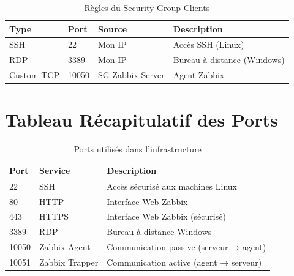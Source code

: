 \begin{table}[H]
\centering
\caption{Règles du Security Group Clients}
\label{tab:sg-clients}
\begin{tabular}{|l|l|l|l|}
\hline
\textbf{Type} & \textbf{Port} & \textbf{Source} & \textbf{Description} \\
\hline
SSH & 22 & Mon IP & Accès SSH (Linux) \\
\hline
RDP & 3389 & Mon IP & Bureau à distance (Windows) \\
\hline
Custom TCP & 10050 & SG Zabbix Server & Agent Zabbix \\
\hline
\end{tabular}
\end{table}

\section{Tableau Récapitulatif des Ports}

\begin{table}[H]
\centering
\caption{Ports utilisés dans l'infrastructure}
\label{tab:ports}
\begin{tabular}{|l|l|p{7cm}|}
\hline
\textbf{Port} & \textbf{Service} & \textbf{Description} \\
\hline
22 & SSH & Accès sécurisé aux machines Linux \\
\hline
80 & HTTP & Interface Web Zabbix \\
\hline
443 & HTTPS & Interface Web Zabbix (sécurisé) \\
\hline
3389 & RDP & Bureau à distance Windows \\
\hline
10050 & Zabbix Agent & Communication passive (serveur → agent) \\
\hline
10051 & Zabbix Trapper & Communication active (agent → serveur) \\
\hline
\end{tabular}
\end{table}

